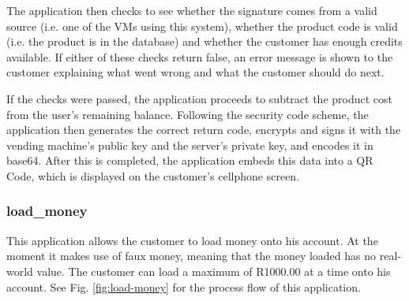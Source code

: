 The application then checks to see whether the signature comes from a valid source (i.e.
one of the VMs using this system), whether the product code is
valid (i.e. the product is in the database) and whether the customer has enough
credits available. If either of these checks return false,
an error message is shown to the customer explaining what went wrong
and what the customer should do next.

If the checks were passed, the application proceeds to subtract the product cost from
the user's remaining balance. Following the security code scheme, the application then
generates the correct return code, encrypts and signs it with the vending
machine's public key and the server's private key, and encodes it in base64.
After this is completed, the application embeds this data into a QR Code, which is
displayed on the customer's cellphone screen.

\subsubsection{load\_money}

This application allows the customer to load money onto his account. At the moment it
makes use of faux money, meaning that the money loaded has no real-world value.
The customer can load a maximum of R1000.00 at a time onto his account. See Fig.
\ref{fig:load-money} for the process flow of this application.


